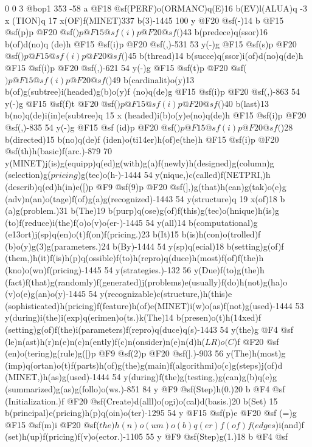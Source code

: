 {{{{{{{0 0 3 @bop1 353 -58 a @F18 @sf(PERF)o(ORMANC)q(E)16 b(EV)l(ALUA)q -3 x
(TION)q 17 x(OF)f(MINET)337 b(3)-1445 100 y @F20 @sf(-)14 b @F15 @sf(p)p 
@F20 @sf(\()p @F15 @sf(i)p @F20 @sf(\))43 b(predece)q(ssor)16 b(of)d(no)q
(de)h @F15 @sf(i)p @F20 @sf(,)-531 53 y(-)g @F15 @sf(s)p @F20 @sf(\()p 
@F15 @sf(i)p @F20 @sf(\))45 b(thread)14 b(succe)q(ssor)i(of)d(no)q(de)h 
@F15 @sf(i)p @F20 @sf(,)-621 54 y(-)g @F15 @sf(t)p @F20 @sf(\()p @F15 @sf
(i)p @F20 @sf(\))49 b(cardinalit)o(y)13 b(of)g(subtree)i(headed)g(b)o(y)f
(no)q(de)g @F15 @sf(i)p @F20 @sf(,)-863 54 y(-)g @F15 @sf(f)t @F20 @sf(\()p 
@F15 @sf(i)p @F20 @sf(\))40 b(last)13 b(no)q(de)i(in)e(subtree)q 15 x
(headed)i(b)o(y)e(no)q(de)h @F15 @sf(i)p @F20 @sf(,)-835 54 y(-)g @F15 @sf
(id)p @F20 @sf(\()p @F15 @sf(i)p @F20 @sf(\))28 b(directed)15 b(no)q(de)f
(iden)o(ti\014er)h(of)e(the)h @F15 @sf(i)p @F20 @sf(th)h(basic)f(arc.)-879 
70 y(MINET)j(is)g(equipp)q(ed)g(with)g(a)f(newly)h(designed)g(column)g
(selection)g(\(pricing\))g(tec)o(h-)-1444 54 y(nique,)c(called)f(NETPRI,)h
(describ)q(ed)h(in)e([)p @F9 @sf(9)p @F20 @sf(],)g(that)h(can)g(tak)o(e)g
(adv)n(an)o(tage)f(of)g(a)g(recognized)-1443 54 y(structure)q 19 x(of)18 b
(a)g(problem.)31 b(The)19 b(purp)q(ose)g(of)f(this)g(tec)o(hnique)h(is)g
(to)f(reduce)i(the)f(o)o(v)o(er-)-1445 54 y(all)14 b(computational)g
(e\013ort)j(sp)q(en)o(t)f(on)f(pricing.)23 b(It)15 b(is)h(con)o(trolled)f
(b)o(y)g(3)g(parameters.)24 b(By)-1444 54 y(sp)q(ecial)18 b(setting)g(of)f
(them,)h(it)f(is)h(p)q(ossible)f(to)h(repro)q(duce)h(most)f(of)f(the)h
(kno)o(wn)f(pricing)-1445 54 y(strategies.)-132 56 y(Due)f(to)g(the)h
(fact)f(that)g(randomly)f(generated)j(problems)e(usually)f(do)h(not)g(ha)o
(v)o(e)g(an)o(y)-1445 54 y(recognizable)c(structure,)h(this)e
(sophisticated)h(pricing)f(feature)h(of)e(MINET)i(w)o(as)f(not)g(used)-1444 
53 y(during)i(the)i(exp)q(erimen)o(ts.)k(The)14 b(presen)o(t)h(\014xed)f
(setting)g(of)f(the)i(parameters)f(repro)q(duce)q(s)-1443 54 y(the)g @F4 @sf
(le)n(ast)h(r)n(e)n(c)n(ently)f(c)n(onsider)n(e)n(d)h(\(LR)o(C\))f @F20 @sf
(en)o(tering)g(rule)g([)p @F9 @sf(2)p @F20 @sf(].)-903 56 y(The)h(most)g
(imp)q(ortan)o(t)f(parts)h(of)g(the)g(main)f(algorithmi)o(c)g(steps)j(of)d
(MINET,)h(as)g(used)-1444 54 y(during)f(the)g(testing,)g(can)g(b)q(e)g
(summarized)g(as)g(follo)o(ws.)-851 84 y @F9 @sf(Step)h(0.)20 b @F4 @sf
(Initialization.)f @F20 @sf(Create)d(all{l)o(ogi)o(cal)d(basis.)20 b(Set)
15 b(principal)e(pricing)h(p)q(oin)o(ter)-1295 54 y @F15 @sf(p)e @F20 @sf
(=)g @F15 @sf(m)i @F20 @sf(\(the)h(n)o(um)o(b)q(er)f(of)f(edges\))i(and)f
(set)h(up)f(pricing)f(v)o(ector.)-1105 55 y @F9 @sf(Step)g(1.)18 b @F4 @sf
}}}}}}}}
